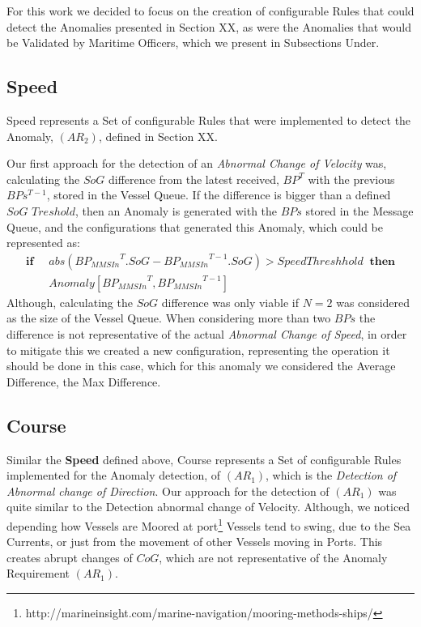 For this work we decided to focus on the creation of configurable Rules that could detect the Anomalies presented in Section XX, as were the Anomalies that would be Validated by Maritime Officers,  which we present in Subsections Under.

\subsection{Speed}
\label{subsection: 4 Speed}
Speed represents a Set of configurable Rules that were implemented to detect the Anomaly, $(AR_2)$, defined in Section XX.

Our first approach for the detection of an \textit{Abnormal Change of Velocity} was, calculating the $SoG$ difference from the latest received, $BP^T$ with the previous $BPs^{T-1}$, stored in the Vessel Queue.
If the difference is bigger than a defined $SoG$ $Treshold$, then an Anomaly is generated with the $BPs$ stored in the Message Queue, and the configurations that generated this Anomaly, which could be represented as:
\begin{align*}
\mathbf{if}\;\;& abs({BP_{MMSIn}}^{T}.SoG - {BP_{MMSIn}}^{T-1}.SoG) > SpeedThreshhold
\;\;\mathbf{then} \\ 
&Anomaly[{BP_{MMSIn}}^{T}, {BP_{MMSIn}}^{T-1}] 
\end{align*}
Although, calculating the $SoG$ difference was only viable if  $N = 2 $ was considered as the size of the Vessel Queue.
When considering more than two $BPs$ the difference is not representative of the actual \textit{Abnormal Change of Speed}, in order to mitigate this we created a new configuration, representing the operation it should be done in this case, which for this anomaly we considered the Average Difference, the Max Difference.

\subsection{Course}
\label{subsection: 4 Course}
Similar the \textbf{Speed} defined above, Course represents a Set of configurable Rules implemented for the Anomaly detection, of $(AR_1)$, which is the \textit{Detection of Abnormal change of Direction}. 
Our approach for the detection of $(AR_1)$ was quite similar to the {Detection abnormal change of Velocity}. 
Although, we noticed depending how Vessels are Moored at port\footnote{http://marineinsight.com/marine-navigation/mooring-methods-ships/}  Vessels tend to swing, due to the Sea Currents, or just from the movement of other Vessels moving in Ports. This creates abrupt changes of $CoG$, which are not representative of the Anomaly Requirement $(AR_1)$.


